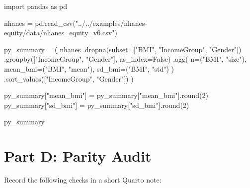 \documentclass[
  letterpaper,
  DIV=11,
  numbers=noendperiod,
  oneside]{scrreprt}
\newenvironment{Shaded}{\begin{snugshade}}{\end{snugshade}}
\newcommand{\BuiltInTok}[1]{\textcolor[rgb]{0.00,0.23,0.31}{#1}}
\newcommand{\DecValTok}[1]{\textcolor[rgb]{0.68,0.00,0.00}{#1}}
\newcommand{\ImportTok}[1]{\textcolor[rgb]{0.00,0.46,0.62}{#1}}
\newcommand{\NormalTok}[1]{\textcolor[rgb]{0.00,0.23,0.31}{#1}}
\newcommand{\OperatorTok}[1]{\textcolor[rgb]{0.37,0.37,0.37}{#1}}
\newcommand{\StringTok}[1]{\textcolor[rgb]{0.13,0.47,0.30}{#1}}
\newcommand{\VariableTok}[1]{\textcolor[rgb]{0.07,0.07,0.07}{#1}}
\begin{document}
\begin{Shaded}
\begin{Highlighting}[numbers=left,,]
\ImportTok{import}\NormalTok{ pandas }\ImportTok{as}\NormalTok{ pd}

\NormalTok{nhanes }\OperatorTok{=}\NormalTok{ pd.read\_csv(}\StringTok{"../../examples/nhanes{-}equity/data/nhanes\_equity\_v6.csv"}\NormalTok{)}

\NormalTok{py\_summary }\OperatorTok{=}\NormalTok{ (}
\NormalTok{    nhanes}
\NormalTok{    .dropna(subset}\OperatorTok{=}\NormalTok{[}\StringTok{"BMI"}\NormalTok{, }\StringTok{"IncomeGroup"}\NormalTok{, }\StringTok{"Gender"}\NormalTok{])}
\NormalTok{    .groupby([}\StringTok{"IncomeGroup"}\NormalTok{, }\StringTok{"Gender"}\NormalTok{], as\_index}\OperatorTok{=}\VariableTok{False}\NormalTok{)}
\NormalTok{    .agg(}
\NormalTok{        n}\OperatorTok{=}\NormalTok{(}\StringTok{"BMI"}\NormalTok{, }\StringTok{"size"}\NormalTok{),}
\NormalTok{        mean\_bmi}\OperatorTok{=}\NormalTok{(}\StringTok{"BMI"}\NormalTok{, }\StringTok{"mean"}\NormalTok{),}
\NormalTok{        sd\_bmi}\OperatorTok{=}\NormalTok{(}\StringTok{"BMI"}\NormalTok{, }\StringTok{"std"}\NormalTok{)}
\NormalTok{    )}
\NormalTok{    .sort\_values([}\StringTok{"IncomeGroup"}\NormalTok{, }\StringTok{"Gender"}\NormalTok{])}
\NormalTok{)}

\NormalTok{py\_summary[}\StringTok{"mean\_bmi"}\NormalTok{] }\OperatorTok{=}\NormalTok{ py\_summary[}\StringTok{"mean\_bmi"}\NormalTok{].}\BuiltInTok{round}\NormalTok{(}\DecValTok{2}\NormalTok{)}
\NormalTok{py\_summary[}\StringTok{"sd\_bmi"}\NormalTok{] }\OperatorTok{=}\NormalTok{ py\_summary[}\StringTok{"sd\_bmi"}\NormalTok{].}\BuiltInTok{round}\NormalTok{(}\DecValTok{2}\NormalTok{)}

\NormalTok{py\_summary}
\end{Highlighting}
\end{Shaded}

\section{Part D: Parity Audit}\label{part-d-parity-audit}

Record the following checks in a short Quarto note:
\end{document}
